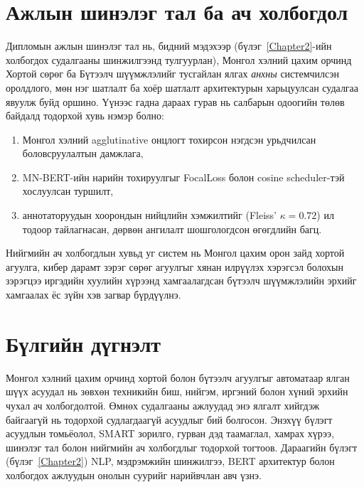 \section{Ажлын шинэлэг тал ба ач холбогдол}

Дипломын ажлын шинэлэг тал нь, бидний мэдэхээр (бүлэг~\ref{Chapter2}-ийн
холбогдох судалгааны шинжилгээнд тулгуурлан), Монгол хэлний цахим орчинд
Хортой сөрөг ба Бүтээлч шүүмжлэлийг тусгайлан ялгах \textit{анхны} системчилсэн
оролдлого, мөн нэг шатлалт ба хоёр шатлалт архитектурын харьцуулсан судалгаа
явуулж буйд оршино. Үүнээс гадна дараах гурав нь салбарын одоогийн төлөв байдалд тодорхой хувь нэмэр болно:
\begin{enumerate}
  \item Монгол хэлний agglutinative онцлогт тохирсон нэгдсэн урьдчилсан боловсруулалтын дамжлага,
  \item MN-BERT-ийн нарийн тохируулгыг FocalLoss болон cosine scheduler-тэй хослуулсан туршилт,
  \item аннотаторуудын хоорондын нийцлийн хэмжилтийг (Fleiss' $\kappa = 0.72$) ил тодоор тайлагнасан, дөрвөн ангилалт шошгологдсон өгөгдлийн багц.
\end{enumerate}

Нийгмийн ач холбогдлын хувьд уг систем нь Монгол цахим орон зайд хортой агуулга,
кибер дарамт зэрэг сөрөг агуулгыг хянан илрүүлэх хэрэгсэл болохын зэрэгцээ
иргэдийн хуулийн хүрээнд хамгаалагдсан бүтээлч шүүмжлэлийн эрхийг хамгаалах
ёс зүйн хэв загвар бүрдүүлнэ.

\section{Бүлгийн дүгнэлт}

Монгол хэлний цахим орчинд хортой болон бүтээлч агуулгыг автоматаар ялган
шүүх асуудал нь зөвхөн техникийн биш, нийгэм, иргэний болон хүний эрхийн
чухал ач холбогдолтой. Өмнөх судалгааны ажлуудад энэ ялгалт хийгдэж
байгаагүй нь тодорхой судлагдаагүй асуудлыг бий болгосон. Энэхүү бүлэгт
асуудлын томьёолол, SMART зорилго, гурван дэд таамаглал, хамрах хүрээ,
шинэлэг тал болон нийгмийн ач холбогдлыг тодорхой тогтоов. Дараагийн
бүлэгт (бүлэг~\ref{Chapter2}) NLP, мэдрэмжийн шинжилгээ, BERT архитектур
болон холбогдох ажлуудын онолын суурийг нарийвчлан авч үзнэ.
